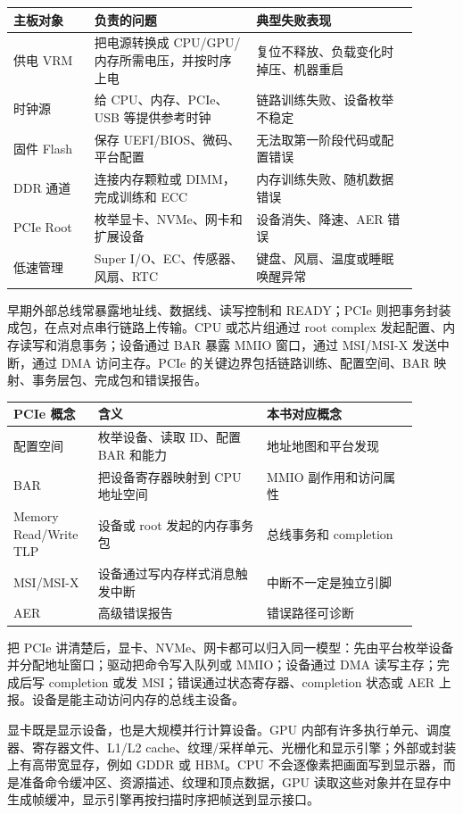 \begin{longtable}{L{0.18\linewidth}L{0.36\linewidth}L{0.36\linewidth}}
\toprule
主板对象 & 负责的问题 & 典型失败表现 \\
\midrule
供电 VRM & 把电源转换成 CPU/GPU/内存所需电压，并按时序上电 & 复位不释放、负载变化时掉压、机器重启 \\
时钟源 & 给 CPU、内存、PCIe、USB 等提供参考时钟 & 链路训练失败、设备枚举不稳定 \\
固件 Flash & 保存 UEFI/BIOS、微码、平台配置 & 无法取第一阶段代码或配置错误 \\
DDR 通道 & 连接内存颗粒或 DIMM，完成训练和 ECC & 内存训练失败、随机数据错误 \\
PCIe Root & 枚举显卡、NVMe、网卡和扩展设备 & 设备消失、降速、AER 错误 \\
低速管理 & Super I/O、EC、传感器、风扇、RTC & 键盘、风扇、温度或睡眠唤醒异常 \\
\bottomrule
\end{longtable}

早期外部总线常暴露地址线、数据线、读写控制和 READY；PCIe 则把事务封装成包，在点对点串行链路上传输。CPU 或芯片组通过 root complex 发起配置、内存读写和消息事务；设备通过 BAR 暴露 MMIO 窗口，通过 MSI/MSI-X 发送中断，通过 DMA 访问主存。PCIe 的关键边界包括链路训练、配置空间、BAR 映射、事务层包、完成包和错误报告。

\begin{longtable}{L{0.18\linewidth}L{0.38\linewidth}L{0.34\linewidth}}
\toprule
PCIe 概念 & 含义 & 本书对应概念 \\
\midrule
配置空间 & 枚举设备、读取 ID、配置 BAR 和能力 & 地址地图和平台发现 \\
BAR & 把设备寄存器映射到 CPU 地址空间 & MMIO 副作用和访问属性 \\
Memory Read/Write TLP & 设备或 root 发起的内存事务包 & 总线事务和 completion \\
MSI/MSI-X & 设备通过写内存样式消息触发中断 & 中断不一定是独立引脚 \\
AER & 高级错误报告 & 错误路径可诊断 \\
\bottomrule
\end{longtable}

把 PCIe 讲清楚后，显卡、NVMe、网卡都可以归入同一模型：先由平台枚举设备并分配地址窗口；驱动把命令写入队列或 MMIO；设备通过 DMA 读写主存；完成后写 completion 或发 MSI；错误通过状态寄存器、completion 状态或 AER 上报。设备是能主动访问内存的总线主设备。

显卡既是显示设备，也是大规模并行计算设备。GPU 内部有许多执行单元、调度器、寄存器文件、L1/L2 cache、纹理/采样单元、光栅化和显示引擎；外部或封装上有高带宽显存，例如 GDDR 或 HBM。CPU 不会逐像素把画面写到显示器，而是准备命令缓冲区、资源描述、纹理和顶点数据，GPU 读取这些对象并在显存中生成帧缓冲，显示引擎再按扫描时序把帧送到显示接口。

